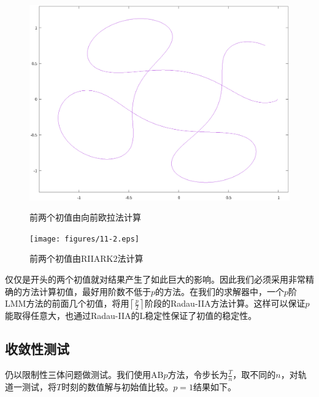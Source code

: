 \documentclass[lang=cn,10pt,bibend=bibtex]{elegantbook}
\begin{document}
\begin{figure}[H]
  \centering
  \begin{minipage}[t]{0.35\linewidth}
      \centering
      \includegraphics[width=0.95\linewidth]{figures/11-1.eps}
      \caption*{\small 前两个初值由向前欧拉法计算}
  \end{minipage}
  \hspace{2em}
  \begin{minipage}[t]{0.35\linewidth}
      \centering
      \texttt{[image: figures/11-2.eps]}
      \caption*{\small 前两个初值由RIIARK$2$法计算}
  \end{minipage}
\end{figure}

仅仅是开头的两个初值就对结果产生了如此巨大的影响。因此我们必须采用非常精确的方法计算初值，最好用阶数不低于$p$的方法。在我们的求解器中，一个$p$阶LMM方法的前面几个初值，将用$\left\lceil\frac{p}{2}\right\rceil$阶段的Radau-IIA方法计算。这样可以保证$p$能取得任意大，也通过Radau-IIA的L稳定性保证了初值的稳定性。

\subsection{收敛性测试}

仍以限制性三体问题做测试。我们使用AB$p$方法，令步长为$\frac{T}{n}$，取不同的$n$，对轨道一测试，将$T$时刻的数值解与初始值比较。$p=1$结果如下。
\end{document}
